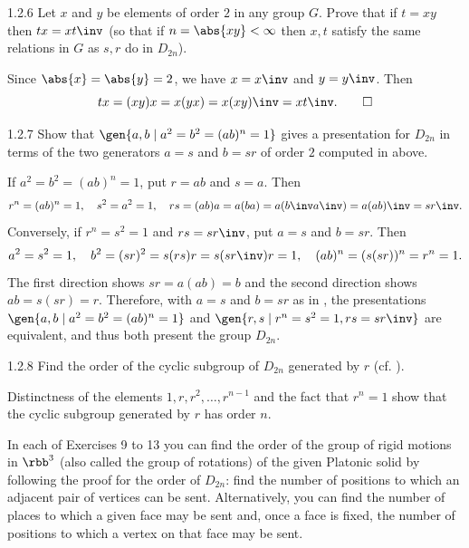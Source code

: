 \begin{exercise}{1.2.6}
    Let $x$ and $y$ be elements of order $2$ in any group $G$.
	Prove that if $t = xy$ then $tx = xt\inv$ (so that if $n = \abs{xy} < \infty$ then $x, t$ satisfy the same relations in $G$ as $s, r$ do in $D_{2n}$).
\end{exercise}

\begin{sol}
    Since $\abs{x} = \abs{y} = 2$, we have $x = x\inv$ and $y = y\inv$.
	Then
    \[
    	tx = (xy)x = x(yx) = x(xy)\inv = x t\inv. \qedhere
    \]
\end{sol}

\begin{exercise}{1.2.7}
    Show that $\gen{a, b \mid a^2 = b^2 = (ab)^n = 1}$ gives a presentation for $D_{2n}$ in terms of the two generators $a = s$ and $b = sr$ of order $2$ computed in  above.
\end{exercise}

\begin{sol}
    If $a^2 = b^2 = (ab)^n = 1$, put $r = ab$ and $s = a$.
    Then
    \[
    	r^n = (ab)^n = 1, \quad s^2 = a^2 = 1, \quad rs = (ab)a = a(ba) = a(b\inv a\inv) = a(ab)\inv = sr\inv.
    \]
    Conversely, if $r^n = s^2 = 1$ and $rs = sr\inv$, put $a = s$ and $b = sr$.
    Then
    \[
    	a^2 = s^2 = 1, \quad b^2 = (sr)^2 = s(rs)r = s(sr\inv)r = 1, \quad (ab)^n = (s(sr))^n = r^n = 1.
    \]
    The first direction shows $sr = a(ab) = b$ and the second direction shows $ab = s(sr) = r$.
    Therefore, with $a = s$ and $b = sr$ as in , the presentations $\gen{a, b \mid a^2 = b^2 = (ab)^n = 1}$ and $\gen{r, s \mid r^n = s^2 = 1, rs = sr\inv}$ are equivalent, and thus both present the group $D_{2n}$.
\end{sol}

\begin{exercise}{1.2.8}
    Find the order of the cyclic subgroup of $D_{2n}$ generated by $r$ (cf. ).
\end{exercise}

\begin{sol}
    Distinctness of the elements $1, r, r^2, \dots, r^{n-1}$ and the fact that $r^n = 1$ show that the cyclic subgroup generated by $r$ has order $n$.
\end{sol}

In each of Exercises 9 to 13 you can find the order of the group of rigid motions in $\rbb^3$ (also called the group of rotations) of the given Platonic solid by following the proof for the order of $D_{2n}$:
find the number of positions to which an adjacent pair of vertices can be sent.
Alternatively, you can find the number of places to which a given face may be sent and, once a face is fixed, the number of positions to which a vertex on that face may be sent.

